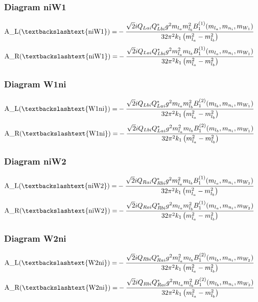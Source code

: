 \documentclass{article}
\begin{document}
\subsubsection{Diagram niW1}
\begin{align*}
\mathtt{\text{A\_L(\textbackslashtext\{niW1\})}} = &- \frac{\sqrt{2} i Q_{Lai} Q_{Lbi}^* g^{2} m_{l_a} m_{l_b}^{2} B^{\left(1\right)}_1(m_{l_a}, m_{n_i}, m_{W_1})}{32 \pi^{2} k_{1} \left(m_{l_a}^{2} - m_{l_b}^{2}\right)} 
\end{align*}
\begin{align*}
\mathtt{\text{A\_R(\textbackslashtext\{niW1\})}} = &- \frac{\sqrt{2} i Q_{Lai} Q_{Lbi}^* g^{2} m_{l_a}^{2} m_{l_b} B^{\left(1\right)}_1(m_{l_a}, m_{n_i}, m_{W_1})}{32 \pi^{2} k_{1} \left(m_{l_a}^{2} - m_{l_b}^{2}\right)} 
\end{align*}
\subsubsection{Diagram W1ni}
\begin{align*}
\mathtt{\text{A\_L(\textbackslashtext\{W1ni\})}} = &- \frac{\sqrt{2} i Q_{Lbi} Q_{Lai}^* g^{2} m_{l_a} m_{l_b}^{2} B^{\left(2\right)}_1(m_{l_b}, m_{n_i}, m_{W_1})}{32 \pi^{2} k_{1} \left(m_{l_a}^{2} - m_{l_b}^{2}\right)} 
\end{align*}
\begin{align*}
\mathtt{\text{A\_R(\textbackslashtext\{W1ni\})}} = &- \frac{\sqrt{2} i Q_{Lbi} Q_{Lai}^* g^{2} m_{l_a}^{2} m_{l_b} B^{\left(2\right)}_1(m_{l_b}, m_{n_i}, m_{W_1})}{32 \pi^{2} k_{1} \left(m_{l_a}^{2} - m_{l_b}^{2}\right)} 
\end{align*}
\subsubsection{Diagram niW2}
\begin{align*}
\mathtt{\text{A\_L(\textbackslashtext\{niW2\})}} = &- \frac{\sqrt{2} i Q_{Rai} Q_{Rbi}^* g^{2} m_{l_a}^{2} m_{l_b} B^{\left(1\right)}_1(m_{l_a}, m_{n_i}, m_{W_2})}{32 \pi^{2} k_{1} \left(m_{l_a}^{2} - m_{l_b}^{2}\right)} 
\end{align*}
\begin{align*}
\mathtt{\text{A\_R(\textbackslashtext\{niW2\})}} = &- \frac{\sqrt{2} i Q_{Rai} Q_{Rbi}^* g^{2} m_{l_a} m_{l_b}^{2} B^{\left(1\right)}_1(m_{l_a}, m_{n_i}, m_{W_2})}{32 \pi^{2} k_{1} \left(m_{l_a}^{2} - m_{l_b}^{2}\right)} 
\end{align*}
\subsubsection{Diagram W2ni}
\begin{align*}
\mathtt{\text{A\_L(\textbackslashtext\{W2ni\})}} = &- \frac{\sqrt{2} i Q_{Rbi} Q_{Rai}^* g^{2} m_{l_a}^{2} m_{l_b} B^{\left(2\right)}_1(m_{l_b}, m_{n_i}, m_{W_2})}{32 \pi^{2} k_{1} \left(m_{l_a}^{2} - m_{l_b}^{2}\right)} 
\end{align*}
\begin{align*}
\mathtt{\text{A\_R(\textbackslashtext\{W2ni\})}} = &- \frac{\sqrt{2} i Q_{Rbi} Q_{Rai}^* g^{2} m_{l_a} m_{l_b}^{2} B^{\left(2\right)}_1(m_{l_b}, m_{n_i}, m_{W_2})}{32 \pi^{2} k_{1} \left(m_{l_a}^{2} - m_{l_b}^{2}\right)} 
\end{align*}
\end{document}
